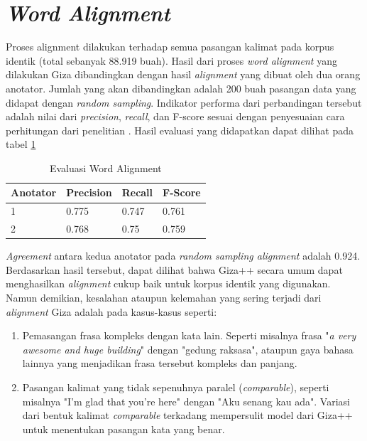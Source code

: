 \section{\textit{Word Alignment}}

Proses alignment dilakukan terhadap semua pasangan kalimat pada korpus identik (total sebanyak 88.919 buah). Hasil dari proses \textit{word alignment} yang dilakukan Giza dibandingkan dengan hasil \textit{alignment} yang dibuat oleh dua orang anotator. Jumlah yang akan dibandingkan adalah 200 buah pasangan data yang didapat dengan \textit{random sampling}. Indikator performa dari perbandingan tersebut adalah nilai dari \textit{precision}, \textit{recall}, dan F-score sesuai dengan penyesuaian cara perhitungan dari penelitian \citep{mihalcea2003evaluation}. Hasil evaluasi yang didapatkan dapat dilihat pada tabel \ref{table:word-alignment-evaluation}

\begin{table}
	\centering
	\caption{Evaluasi Word Alignment}
	\label{table:word-alignment-evaluation}
	\begin{tabular}{|p{2cm}|p{2cm}|p{2cm}|p{2cm}|}
		\hline
		\textbf{Anotator} & \textbf{Precision} & \textbf{Recall} & \textbf{F-Score}
		\\ \hline
		1 & 0.775 & 0.747 & 0.761
		\\ \hline
		2 & 0.768 & 0.75 & 0.759
		\\ \hline
	\end{tabular} 
\end{table}

\textit{Agreement} antara kedua anotator pada \textit{random sampling alignment} adalah 0.924. Berdasarkan hasil tersebut, dapat dilihat bahwa Giza++ secara umum dapat menghasilkan \textit{alignment} cukup baik untuk korpus identik yang digunakan. Namun demikian, kesalahan ataupun kelemahan yang sering terjadi dari \textit{alignment} Giza adalah pada kasus-kasus seperti:

\begin{enumerate}
	\item Pemasangan frasa kompleks dengan kata lain. Seperti misalnya frasa "\textit{a very awesome and huge building}" dengan "gedung raksasa", ataupun gaya bahasa lainnya yang menjadikan frasa tersebut kompleks dan panjang.
	\item Pasangan kalimat yang tidak sepenuhnya paralel (\textit{comparable}), seperti misalnya "I'm glad that you're here" dengan "Aku senang kau ada". Variasi dari bentuk kalimat \textit{comparable} terkadang mempersulit model dari Giza++ untuk menentukan pasangan kata yang benar.
\end{enumerate}

